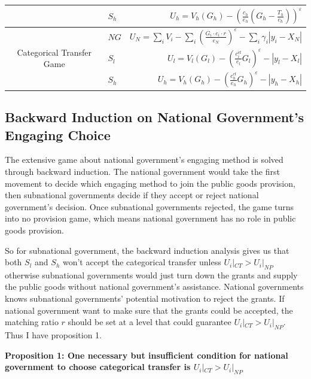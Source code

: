 \begin{itemize}
\begin{table}[H]
\begin{tabular}{cp{2.855em}r}
        \cmidrule{2-2}                                             & $S_h$  & $U_h=V_h\left(G_{h}\right)-\left(\frac{c_h}{e_h}\left(G_{h }-\frac{T_h}{c_h}\right)\right)^{\varepsilon} $             \\
        \midrule
        \multirow{3}[6]{*}{Categorical Transfer Game}              & $NG$   & $U_N=\sum_i V_i-\sum_i\left(\frac{G_i \cdot c_i \cdot r}{e_N}\right)^{\varepsilon}-\sum_i\gamma_i\left|y_i-X_N\right|$ \\
        \cmidrule{2-2}                                             & $S_l$  & $U_l=V_l\left(G_l\right)-\left(\frac{c_i^{c t}}{e_l} G_l\right)^{\varepsilon}-\left|y_l-X_l\right|$                    \\
        \cmidrule{2-2}                                             & $S_h$  & $U_h=V_h\left(G_h\right)-\left(\frac{c_h^{c t}}{e_h} G_h\right)^{\varepsilon}-\left|y_h-X_h\right|$                    \\
        \bottomrule
    \end{tabular}%
    \label{utilitytable}%
\end{table}%

\subsection{Backward Induction on National Government's Engaging Choice}
The extensive game about national government's engaging method is solved through backward induction. The national government would take the first movement to decide which engaging method to join the public goods provision, then subnational governments decide if they accept or reject national government's decision. Once subnational governments rejected, the game turns into no provision game, which means national government has no role in public goods provision.

So for subnational government, the backward induction analysis gives us that both $S_l$ and $S_h$ won’t accept the categorical transfer unless $U_i|_{CT}>U_i|_{NP}$ otherwise subnational governments would just turn down the grants and supply the public goods without national government's assistance. National governments knows subnational governments' potential motivation to reject the grants. If national government want to make sure that the grants could be accepted, the matching ratio $r$ should be set at a level that could guarantee $U_i|_{CT} > U_i|_{NP}$. Thus I have proposition 1.

\textbf{Proposition 1: One necessary but insufficient condition for national government to choose categorical transfer is $U_i|_{CT} > U_i|_{NP}$}


\end{itemize}
